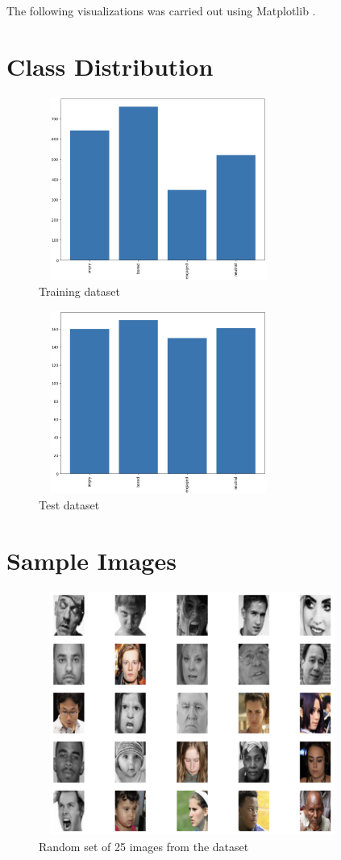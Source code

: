 The following visualizations was carried out using Matplotlib \cite{Matplotlib}.

\section{Class Distribution}
\begin{figure}[h!]
    \centering
    \includegraphics[width=0.7\textwidth, height=6cm]{resources/bg-train.png}
    \caption{Training dataset}
  \end{figure}

  \begin{figure}[h!]
    \centering
    \includegraphics[width=0.7\textwidth, height=6cm]{resources/bg-test.png}
    \caption{Test dataset}
  \end{figure}

\section{Sample Images}

\begin{figure}[h!]
    \centering
    \includegraphics[width=0.9\textwidth, height=8cm]{resources/random25.png}
    \caption{Random set of 25 images from the dataset}
  \end{figure}


